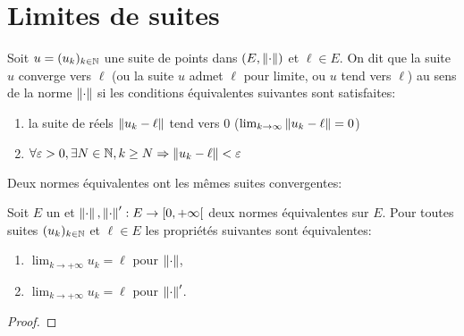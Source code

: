 
                        \section{Limites de suites}

                        \begin{definition}
                            Soit $u=(u_k)_{k\in\mathbb{N}}$ une suite de points dans $(E,\left\lVert\cdot\right\rVert)$ et $\ell\in E$. On dit que la suite $u$ {converge} vers $\ell$ (ou la suite $u$ admet $\ell$ pour {limite}, ou $u$ tend vers $\ell$) au sens de la norme $\left\lVert\cdot\right\rVert$ si les conditions équivalentes suivantes sont satisfaites:
                            \begin{enumerate}
                                \item la suite de réels  $ \left\lVert u_{k} - \ell\right\rVert$  tend vers 0 (\ie  $\lim_{k\to \infty} \left\lVert u_{k} -\ell\right\rVert = 0$)
                                \item $\forall \varepsilon>0, \exists N\in\mathbb{N}, k\geq N \Rightarrow \left\lVert u_k - \ell\right\rVert < \varepsilon$
                            \end{enumerate}
                        \end{definition}

                        \sld{\vfill\pagebreak[5]}%
                        \noindent Deux normes équivalentes ont les mêmes suites convergentes:
                        \begin{proposition}
                            Soit $E$ un \rev{} et $\left\lVert\cdot\right\rVert,\left\lVert\cdot\right\rVert': E \to [0,+\infty[$ deux normes équivalentes sur $E$. Pour toutes suites $(u_{k})_{k\in\mathbb{N}}$ et $\ell\in E$ les propriétés suivantes sont équivalentes:
                                    \begin{enumerate}
                                        \item $\lim_{k\to +\infty} u_{k} = \ell$ pour $\left\lVert\cdot\right\rVert$,
                                        \item $\lim_{k\to +\infty} u_{k} = \ell$ pour $\left\lVert\cdot\right\rVert'$.
                                    \end{enumerate}
                                \end{proposition}

                                \begin{proof}
                                    \pl{\rep{9cm}	}
                                \end{proof}

